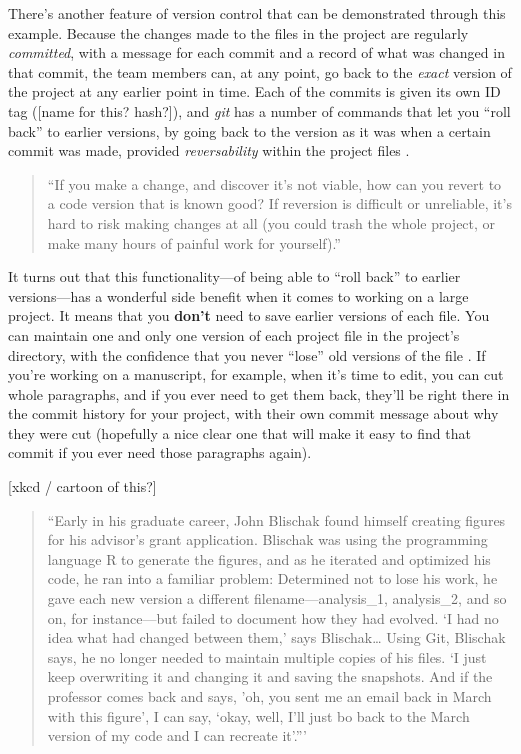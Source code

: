 \documentclass[]{tufte-book}
\begin{document}
There's another feature of version control that can be demonstrated through this
example. Because the changes made to the files in the project are regularly
\emph{committed}, with a message for each commit and a record of what was changed in
that commit, the team members can, at any point, go back to the \emph{exact} version
of the project at any earlier point in time. Each of the commits is given its
own ID tag ({[}name for this? hash?{]}), and \emph{git} has a number of commands that let
you ``roll back'' to earlier versions, by going back to the version as it was when
a certain commit was made, provided \emph{reversability} within the project files
\citep{raymondunderstanding}.

\begin{quote}
``If you make a change, and discover it's not viable, how can you revert
to a code version that is known good? If reversion is difficult or unreliable,
it's hard to risk making changes at all (you could trash the whole project, or
make many hours of painful work for yourself).'' \citep{raymond2003art}
\end{quote}

It turns out that this functionality---of being able to ``roll back'' to earlier
versions---has a wonderful side benefit when it comes to working on a large
project. It means that you \textbf{don't} need to save earlier versions of each file.
You can maintain one and only one version of each project file in the project's
directory, with the confidence that you never ``lose'' old versions of the file
\citep{perkel2018git, blischak2016quick}. If you're working on a manuscript, for
example, when it's time to edit, you can cut whole paragraphs, and if you ever
need to get them back, they'll be right there in the commit history for your
project, with their own commit message about why they were cut (hopefully a nice
clear one that will make it easy to find that commit if you ever need those
paragraphs again).

{[}xkcd / cartoon of this?{]}

\begin{quote}
``Early in his graduate career, John Blischak found himself creating figures
for his advisor's grant application. Blischak was using the programming language
R to generate the figures, and as he iterated and optimized his code, he ran
into a familiar problem: Determined not to lose his work, he gave each new
version a different filename---analysis\_1, analysis\_2, and so on, for
instance---but failed to document how they had evolved. `I had no idea what had
changed between them,' says Blischak\ldots{} Using Git, Blischak says, he no longer
needed to maintain multiple copies of his files. `I just keep overwriting it and
changing it and saving the snapshots. And if the professor comes back and says,
'oh, you sent me an email back in March with this figure', I can say, `okay,
well, I'll just bo back to the March version of my code and I can recreate
it'.''' \citep{perkel2018git}
\end{quote}
\end{document}
